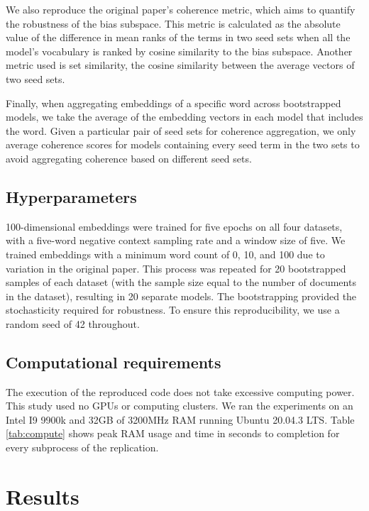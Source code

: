 We also reproduce the original paper's coherence metric, which aims to quantify the robustness of
the bias subspace. This metric is calculated as the absolute value of the difference in mean ranks
of the terms in two seed sets when all the model's vocabulary is ranked by cosine similarity to the
bias subspace. Another metric used is set similarity, the cosine similarity between the average
vectors of two seed sets.

Finally, when aggregating embeddings of a specific word across bootstrapped models, we take the
average of the embedding vectors in each model that includes the word. Given a particular pair of
seed sets for coherence aggregation, we only average coherence scores for models containing every
seed term in the two sets to avoid aggregating coherence based on different seed sets.

\subsection{Hyperparameters} 100-dimensional embeddings were trained for five epochs on all four
datasets, with a five-word negative context sampling rate and a window size of five. We trained
embeddings with a minimum word count of 0, 10, and 100 due to variation in the original paper. This
process was repeated for 20 bootstrapped samples of each dataset (with the sample size equal to the
number of documents in the dataset), resulting in 20 separate models. The bootstrapping provided the
stochasticity required for robustness. To ensure this reproducibility, we use a random seed of 42
throughout.

\subsection{Computational requirements} The execution of the reproduced code does not take excessive
computing power. This study used no GPUs or computing clusters. We ran the experiments on an Intel
I9 9900k and 32GB of 3200MHz RAM running Ubuntu 20.04.3 LTS. Table \ref{tab:compute} shows peak RAM
usage and time in seconds to completion for every subprocess of the replication.

\section{Results} \label{sec:results}

